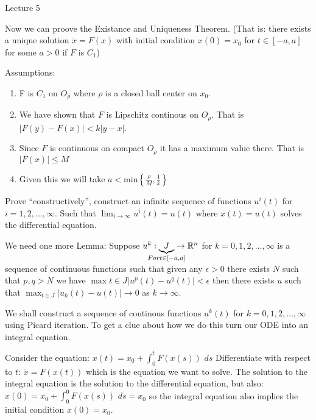 \begin{center}

Lecture 5

\end{center}

Now we can proove the Existance and Uniqueness Theorem. (That is: there exists a unique solution $\dot{x} = F(x)$ with initial condition $x(0) = x_0$ for $t \in [-a, a]$ for some $a > 0$ if $F$ is $C_1$)


Assumptions:
\begin{enumerate}
\item F is $C_1$ on $O_{\rho}$ where $\rho$ is a closed ball center on $x_0$.
\item We have shown that $F$ is Lipschitz continous on $O_{\rho}$. That is $|F(y) - F(x)| < k |y-x|$.
\item Since $F$ is continuous on compact $O_{\rho}$ it has a maximum value there. That is $|F(x)| \leq M$
\item Given this we will take $a < \text{min} \left\{\frac{\rho}{M}, \frac{1}{k}\right\}$
\end{enumerate}

Prove ``constructively'', construct an infinite sequence of functions $u^i (t)$ for $i = 1,2,\ldots,\infty$. Such that $\lim_{i\rightarrow \infty} u^i(t) = u(t)$ where $x(t) = u(t)$ solves the differential equation.

We need one more Lemma: Suppose $u^k : \underbrace{J}_{\mathclap{For t \in [-a, a]}} \rightarrow \mathbb{R}^n$ for $k=0,1,2,\ldots,\infty$ is a sequence of continuous functions such that given any $\epsilon > 0$ there exists $N$ such that $p,q > N$ we have $\max{t \in J} | u^p(t) - u^q(t) | < \epsilon$ then there exists $u$ such that $\max_{t \in J} |u_k(t) - u(t)| \rightarrow 0$ as $k \rightarrow \infty$.

We shall construct a sequence of continous functions $u^k (t)$ for $k=0,1,2,\ldots,\infty$ using Picard iteration. To get a clue about how we do this turn our ODE into an integral equation.

\vspace{\baselineskip}

Consider the equation: $x(t) = x_0 + \int_0^t F(x(s)) \,\, ds$ Differentiate with respect to $t$: $\dot{x} = F(x(t))$ which is the equation we want to solve. The solution to the integral equation is the solution to the differential equation, but also: $x(0) = x_0 + \int_0^0 F(x(s)) \, \, ds = x_0$ so the integral equation also implies the initial condition $x(0) = x_0$.

